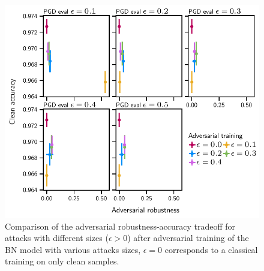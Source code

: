 \documentclass[../main.tex]{subfiles}
\begin{document}
		\begin{figure}[htbp]
			\centering
			\includegraphics[scale=0.9]{MLP_BN_adversarial_tradeoff.pdf}
			\caption[ BN adversarial robustness-accuracy tradeoff]{Comparison of the adversarial robustness-accuracy tradeoff for  attacks with different sizes (\(\epsilon > 0\)) after adversarial training of the  BN model with various  attacks sizes, \(\epsilon = 0\) corresponds to a classical training on only clean samples.}\label{fig:mlp_bn_adv_tradeoff}
		\end{figure}
\end{document}
